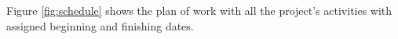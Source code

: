 \documentclass[conference]{IEEEtran}
\begin{document}
Figure \ref{fig:schedule} shows the plan of work with all the project's activities with assigned beginning and finishing dates.


%
%



%
%
\end{document}
